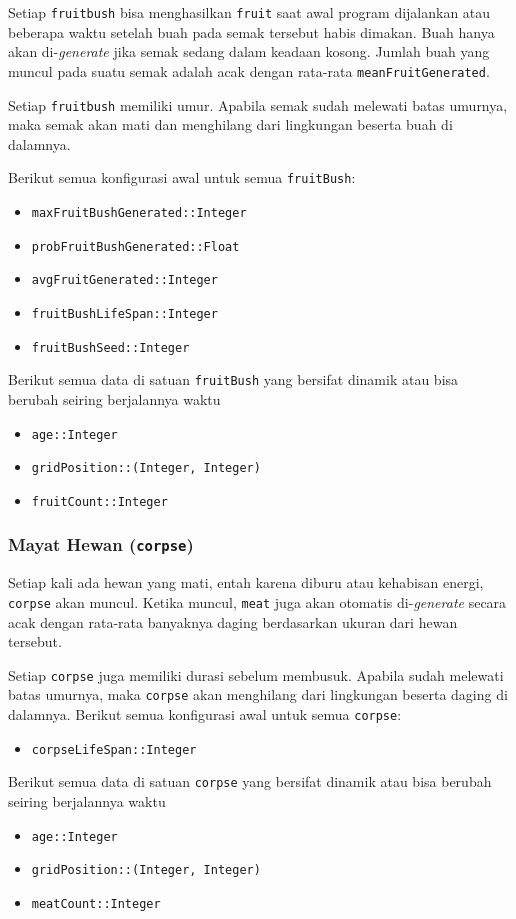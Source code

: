\documentclass[12pt]{article}
\begin{document}
\noindent Setiap \texttt{fruitbush} bisa menghasilkan \texttt{fruit} saat awal program dijalankan atau beberapa waktu setelah buah pada semak tersebut habis dimakan. Buah hanya akan di-\textit{generate} jika semak sedang dalam keadaan kosong. Jumlah buah yang muncul pada suatu semak adalah acak dengan rata-rata \texttt{meanFruitGenerated}.

\noindent Setiap \texttt{fruitbush} memiliki umur. Apabila semak sudah melewati batas umurnya, maka semak akan mati dan menghilang dari lingkungan beserta buah di dalamnya.

\noindent Berikut semua konfigurasi awal untuk semua \texttt{fruitBush}:
\begin{itemize}
    \item \texttt{maxFruitBushGenerated::Integer}
    \item \texttt{probFruitBushGenerated::Float }
    \item \texttt{avgFruitGenerated::Integer}
    \item \texttt{fruitBushLifeSpan::Integer}
    \item \texttt{fruitBushSeed::Integer}
\end{itemize}
\noindent Berikut semua data di satuan \texttt{fruitBush} yang bersifat dinamik atau bisa berubah seiring berjalannya waktu
\begin{itemize}
    \item \texttt{age::Integer}
    \item \texttt{gridPosition::(Integer, Integer)}
    \item \texttt{fruitCount::Integer}
\end{itemize}
\subsubsection{Mayat Hewan (\texttt{corpse})}
Setiap kali ada hewan yang mati, entah karena diburu atau kehabisan energi, \texttt{corpse} akan muncul. Ketika muncul, \texttt{meat} juga akan otomatis di-\textit{generate} secara acak dengan rata-rata banyaknya daging berdasarkan ukuran dari hewan tersebut.

\noindent Setiap \texttt{corpse} juga memiliki durasi sebelum membusuk. Apabila sudah melewati batas umurnya, maka \texttt{corpse} akan menghilang dari lingkungan beserta daging di dalamnya.
\noindent Berikut semua konfigurasi awal untuk semua \texttt{corpse}:
\begin{itemize}
    \item \texttt{corpseLifeSpan::Integer}
\end{itemize}
\noindent Berikut semua data di satuan \texttt{corpse} yang bersifat dinamik atau bisa berubah seiring berjalannya waktu
\begin{itemize}
    \item \texttt{age::Integer}
    \item \texttt{gridPosition::(Integer, Integer)}
    \item \texttt{meatCount::Integer}
\end{itemize}
\end{document}

